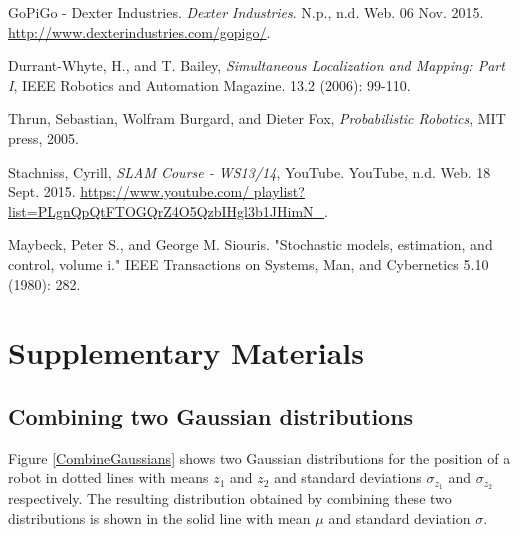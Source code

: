 \documentclass[conference]{IEEEtran}
\begin{document}

%
%
%
\begin{thebibliography}{1}

GoPiGo - Dexter Industries. \emph{Dexter Industries}. N.p., n.d. Web. 06 Nov. 2015. \url{http://www.dexterindustries.com/gopigo/}.

Durrant-Whyte, H., and T. Bailey, \emph{Simultaneous Localization and Mapping: Part I}, IEEE Robotics and Automation Magazine. 13.2 (2006): 99-110.

Thrun, Sebastian, Wolfram Burgard, and Dieter Fox, \emph{Probabilistic Robotics}, MIT press, 2005.

Stachniss, Cyrill, \emph{SLAM Course - WS13/14}, YouTube. YouTube, n.d. Web. 18 Sept. 2015. \url{https://www.youtube.com/ playlist?list=PLgnQpQtFTOGQrZ4O5QzbIHgl3b1JHimN_}.

Maybeck, Peter S., and George M. Siouris. "Stochastic models, estimation, and control, volume i." IEEE Transactions on Systems, Man, and Cybernetics 5.10 (1980): 282.

\end{thebibliography}

\section{Supplementary Materials}
\subsection{Combining two Gaussian distributions}
\label{sssec:num1} 
Figure \ref{CombineGaussians} shows two Gaussian distributions for the position of a robot in dotted lines with means $z_1$ and $z_2$ and standard deviations $\sigma_{z_1}$ and $\sigma_{z_2}$ respectively. The resulting distribution obtained by combining these two distributions is shown in the solid line with mean $\mu$ and standard deviation $\sigma$.\\
\end{document}
